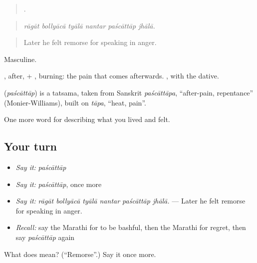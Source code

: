 \begin{quote}
     .
\end{quote}

\begin{quote}
\emph{rāgāt bollyācā tyālā nantar paścāttāp jhālā.}
\end{quote}

\begin{quote}
Later he felt remorse for speaking in anger.
\end{quote}

Masculine.

, after, + , burning: the pain that comes afterwards.  , with the dative.

\begin{cousinweb}
\textbf{} (\emph{paścāttāp}) is a tatsama, taken from Sanskrit \emph{paścāttāpa}, \textquotedblleft{}after-pain, repentance\textquotedblright{} (Monier-Williams), built on \emph{tāpa}, \textquotedblleft{}heat, pain\textquotedblright{}.
\end{cousinweb}

\begin{grammarlens}[title={What you've built}]
One more word for describing what you lived and felt.
\end{grammarlens}

\subsection*{Your turn}
\begin{itemize}
\raggedright
  \item \emph{Say it:} \emph{paścāttāp}
  \item \emph{Say it:} \emph{paścāttāp}, once more
  \item \emph{Say it:} \emph{rāgāt bollyācā tyālā nantar paścāttāp jhālā.} — Later he felt remorse for speaking in anger.
  \item \emph{Recall:} say the Marathi for to be bashful, then the Marathi for regret, then say \emph{paścāttāp} again
\end{itemize}

\begin{tcolorbox}[breakable,colback=teal!4,colframe=teal!35!black,title={Before you move on}]
What does  mean? (\textquotedblleft{}Remorse\textquotedblright{}.) Say it once more.
\end{tcolorbox}
